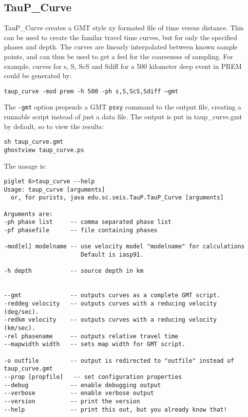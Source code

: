 \subsection{TauP\_Curve}
TauP\_Curve creates a GMT style xy formated file of time versus distance. 
This can be used to create the familar travel time curves, but for
only the specified phases and depth. The curves are linearly interpolated 
between known sample points, and can thus be used to get a feel for the 
coarseness of sampling. For example, curves for s, S, ScS and Sdiff
for a 500 kilometer deep event in PREM could be generated by:

\texttt{taup\_curve -mod prem -h 500 -ph s,S,ScS,Sdiff --gmt}

The \texttt{-gmt} option prepends a GMT \texttt{psxy} command to the output 
file, creating a runnable script instead of just a data file. 
The output is put in taup\_curve.gmt by default, so to view the results:

\begin{verbatim}
sh taup_curve.gmt
ghostview taup_curve.ps
\end{verbatim}

The uasage is:
\begin{verbatim}
piglet 6>taup_curve --help
Usage: taup_curve [arguments]
  or, for purists, java edu.sc.seis.TauP.TauP_Curve [arguments]

Arguments are:
-ph phase list     -- comma separated phase list
-pf phasefile      -- file containing phases

-mod[el] modelname -- use velocity model "modelname" for calculations
                      Default is iasp91.

-h depth           -- source depth in km


--gmt              -- outputs curves as a complete GMT script.
-reddeg velocity   -- outputs curves with a reducing velocity (deg/sec).
-redkm velocity    -- outputs curves with a reducing velocity (km/sec).
-rel phasename     -- outputs relative travel time
--mapwidth width   -- sets map width for GMT script.

-o outfile         -- output is redirected to "outfile" instead of taup_curve.gmt
--prop [propfile]   -- set configuration properties
--debug            -- enable debugging output
--verbose          -- enable verbose output
--version          -- print the version
--help             -- print this out, but you already know that!
\end{verbatim} 
 
